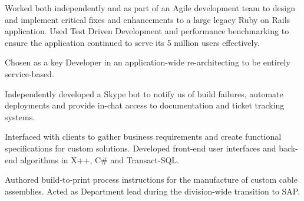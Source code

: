 
    Worked both independently and as part of an Agile development team to design
    and implement critical fixes and enhancements to a large legacy Ruby on
    Rails application. Used Test Driven Development and performance benchmarking
    to ensure the application continued to serve its 5 million users
    effectively.

    \begin{reslist}
      \item{Chosen as a key Developer in an application-wide re-architecting to
        be entirely service-based.}
      \item{Independently developed a Skype bot to notify us of build failures,
        automate deployments and provide in-chat access to documentation and
        ticket tracking systems.}
    \end{reslist}


    Interfaced with clients to gather business requirements and create
    functional specifications for custom solutions. Developed front-end user
    interfaces and back-end algorithms in X++, C\# and Transact-SQL.

    \vspace{6 pt}


    Authored build-to-print process instructions for the manufacture of custom
    cable assemblies. Acted as Department lead during the division-wide
    transition to SAP.

    \vspace{6 pt}




